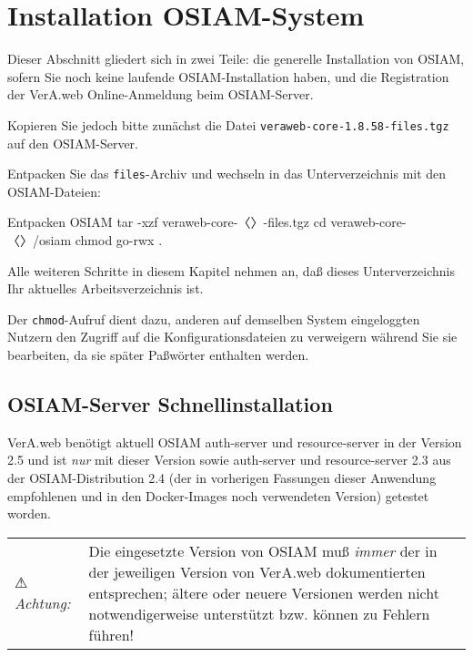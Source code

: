 \documentclass{tarentanleitung}
\newcommand{\vwiaverssw}{1.8.58}
\newcommand{\vwiaversosiam}{2.5}
\begin{document}
\section{Installation OSIAM-System}\label{sec:setup-osiam}

Dieser Abschnitt gliedert sich in zwei Teile: die generelle Installation
von OSIAM, sofern Sie noch keine laufende OSIAM-Installation haben, und
die Registration der VerA.web Online-Anmeldung beim OSIAM-Server.

Kopieren Sie jedoch bitte zunächst die Datei
\texttt{veraweb-core-\vwiaverssw{}-files.tgz}
auf den OSIAM-Server.

\begin{minipage}{\linewidth}
Entpacken Sie das \texttt{files}-Archiv und wechseln in das
Unterverzeichnis mit den OSIAM-Dateien:

\begin{lstdump}{Entpacken OSIAM}
tar -xzf veraweb-core-〈\lstdumpesc{\vwiaverssw}〉-files.tgz
cd veraweb-core-〈\lstdumpesc{\vwiaverssw}〉/osiam
chmod go-rwx .
\end{lstdump}
\end{minipage}

Alle weiteren Schritte in diesem Kapitel nehmen an, daß dieses
Unterverzeichnis Ihr aktuelles Arbeitsverzeichnis ist.

Der \texttt{chmod}-Aufruf dient dazu, anderen auf demselben System
eingeloggten Nutzern den Zugriff auf die Konfigurationsdateien zu
verweigern während Sie sie bearbeiten, da sie später Paßwörter
enthalten werden.

\subsection{OSIAM-Server Schnellinstallation}\label{subsec:setup-osiam-fast}

VerA.web benötigt aktuell OSIAM auth-server und resource-server in
der Version \vwiaversosiam{} und ist \emph{nur} mit dieser Version
sowie auth-server und resource-server 2.3 aus der OSIAM-Distribution
2.4 (der in vorherigen Fassungen dieser Anwendung empfohlenen und in
den Docker-Images noch verwendeten Version) getestet worden.\keinumbruch

\begin{tabu}{@{}l@{ }X@{}}
⚠ \emph{Achtung:} & Die eingesetzte Version von OSIAM muß \emph{immer} der
in der jeweiligen Version von VerA.web dokumentierten entsprechen; ältere
oder neuere Versionen werden nicht notwendigerweise unterstützt bzw. können
zu Fehlern führen!
\end{tabu}
\end{document}
